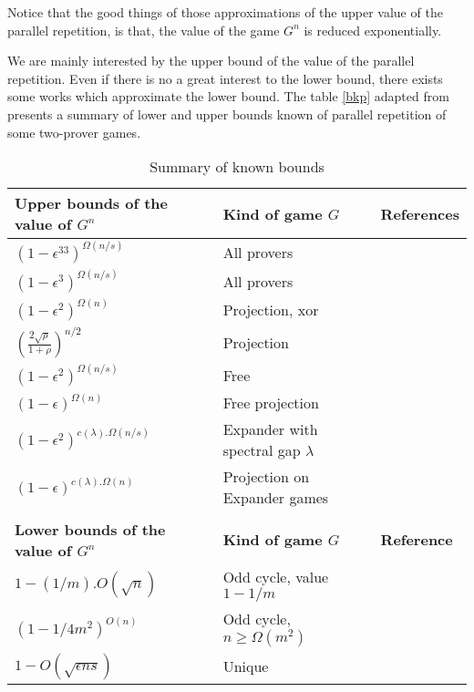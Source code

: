 Notice that the good things of those approximations of the upper value of the parallel repetition, is that,  the value of the game $G^n$ is reduced exponentially.

We are mainly interested by the upper bound of the value of the parallel repetition. Even if there is no a great interest to the lower bound, there exists some works which approximate the lower bound. The table \eqref{bkp} adapted from \cite{tamaki2015parallel} presents a summary of lower and upper bounds known of parallel repetition of some two-prover games.

\begin{table}[h]
\begin{tabular}{lll}
\hline 
\textbf{Upper bounds of the value of $G^n$} &\textbf{ Kind of game $G$} & \textbf{References} \\ 
\hline 
$(1-\epsilon^33)^{\Omega(n/s) }$& All provers &  \cite{raz1998parallel} \\ 
$(1-\epsilon^3)^{\Omega(n/s) }$&  All provers &  \cite{holenstein2007parallel} \\ 
$(1-\epsilon^2)^{\Omega(n) }$&  Projection, xor & \cite{rao2011parallel,raz2010parallel}\\
$\left(\frac{2\sqrt{\rho}}{1+\rho} \right)^{n/2}$ & Projection & \cite{dinur2014analytical} \\
$(1-\epsilon^2)^{\Omega(n/s) }$& Free & \cite{barak2009strong}\\
$(1-\epsilon)^{\Omega(n) }$ & Free projection & \cite{barak2009strong}\\
$(1-\epsilon^2)^{c(\lambda). \Omega(n/s) }$& Expander with spectral gap $\lambda$ & \cite{raz2012strong}\\
$(1-\epsilon)^{c(\lambda). \Omega(n) }$& Projection on Expander games & \cite{raz2012strong}\\
\hline \\
\hline
\textbf{Lower bounds of the value of $G^n$} & \textbf{Kind of game $G$} & \textbf{Reference} \\ 
\hline 
$1-(1/m).{O(\sqrt{n})}$& Odd cycle, value $1-1/m$ & \cite{feige2007understanding}\\
$(1-1/4m^2)^{O(n)}$& Odd cycle, $n\geq \Omega(m^2)$ & \cite{raz2011counterexample}\\
$1-O(\sqrt{\epsilon ns})$ & Unique & \cite{steurer2010improved} \\
\hline 
\end{tabular} 
\caption{Summary of known bounds} \label{bkp}
\end{table}



